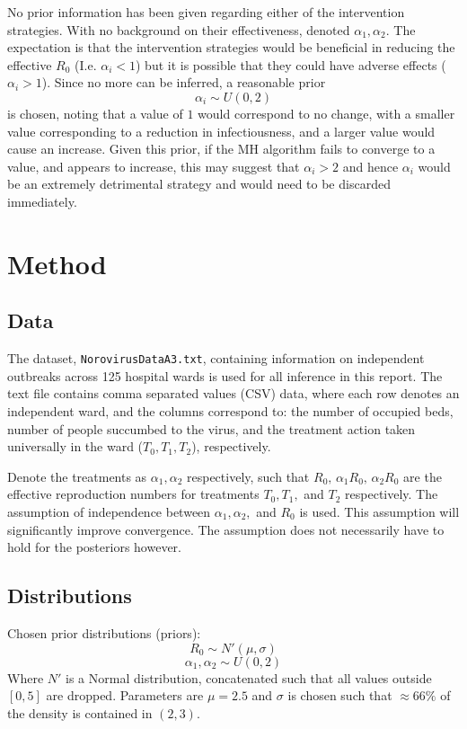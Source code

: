 \documentclass{X:/Documents/Coding/Latex/myassignment}
\begin{document}
No prior information has been given regarding either of the intervention strategies.  
With no background on their effectiveness, denoted $\alpha_1, \alpha_2$. The expectation is that the intervention strategies would be beneficial in reducing the effective $R_0$ (I.e. $\alpha_i < 1$) but it is possible that they could have adverse effects ($\alpha_i > 1$). Since no more can be inferred, a reasonable prior 
\[\alpha_i \sim U(0,2)\] 
is chosen, noting that a value of $1$ would correspond to no change, with a smaller value corresponding to a reduction in infectiousness, and a larger value would cause an increase. Given this prior, if the MH algorithm fails to converge to a value, and appears to increase, this may suggest that $\alpha_i >2$ and hence $\alpha_i$ would be an extremely detrimental strategy and would need to be discarded immediately. 















\section{Method}
\subsection{Data}
The dataset, \verb|NorovirusDataA3.txt|, containing information on independent outbreaks across 125 hospital wards is used for all inference in this report. The text file contains comma separated values (CSV) data, where each row denotes an independent ward, and the columns correspond to: the number of occupied beds, number of people succumbed to the virus, and the treatment action taken universally in the ward ($T_0,T_1,T_2$), respectively. 


Denote the treatments as $\alpha_1,\alpha_2$ respectively, such that $R_0,\, \alpha_1 R_0,\, \alpha_2 R_0$ are the effective reproduction numbers for treatments $T_0,T_1,$ and $T_2$ respectively. 
The assumption of independence between $\alpha_1,\alpha_2,$ and $R_0$ is used. This assumption will significantly improve convergence. The assumption does not necessarily have to hold for the posteriors however. 


\subsection{Distributions}
Chosen prior distributions (priors):
\[R_0 \sim N'(\mu,\sigma)\]
\[\alpha_1 , \alpha_2 \sim U(0,2)\]
Where $N'$ is a Normal distribution, concatenated such that all values outside $[0,5]$ are dropped. Parameters are $\mu = 2.5$ and $\sigma$ is chosen such that $\approx 66\%$ of the density is contained in $(2,3)$. 
\end{document}
